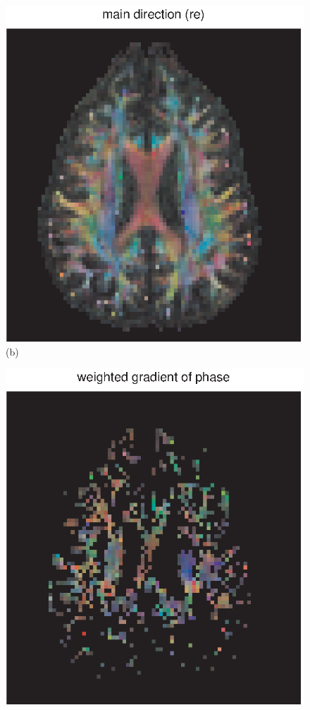 \documentclass[authoryear,preprint,12pt]{elsarticle}
\begin{document}
\begin{figure}[p]
\begin{center}
\begin{minipage}[]{.42\textwidth}
      \includegraphics[width=\textwidth]{maindirecreal.eps}
      (b)
      \end{minipage}
      \begin{minipage}[]{.42\textwidth}
      \centering
       \includegraphics[width=\textwidth]{1gradphase55b.eps}

\end{minipage}
\end{center}
\end{figure}
\end{document}

